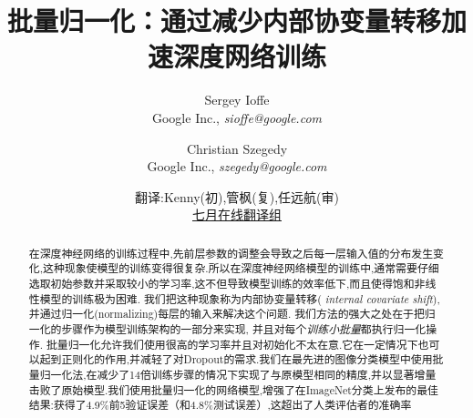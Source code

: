 \documentclass[twocolumn]{article}
\begin{document}
\newcommand{\jac}[2]{\frac{\partial #1}{\partial #2}}
\newcommand{\xhat}{\widehat{x}}
\newcommand{\yhat}{\widehat{y}}
\newcommand{\zhat}{\widehat{z}}
\newcommand{\vxhat}{\widehat\mathrm{x}}
\newcommand{\vzhat}{\widehat\mathrm{z}}
\newcommand{\setX}{\mathcal{X}}
\newcommand{\setB}{\mathcal{B}}
\newcommand{\E}{\text{E}}
\newcommand{\Var}{\text{Var}}
\newcommand{\Cov}{\text{Cov}}
\newcommand{\Fhat}{\widehat{F}}
\newcommand{\Thetahat}{\widehat{\Theta}}
\newcommand{\Norm}{\text{Norm}}
\newcommand{\BatchNorm}{\text{BN}}
\newcommand{\kk}{{(k)}}
\newcommand{\vx}{\mathrm{x}}
\newcommand{\vy}{\mathrm{y}}
\newcommand{\vz}{\mathrm{z}}
\newcommand{\vb}{\mathrm{b}}
\newcommand{\vu}{\mathrm{u}}
\newcommand{\comt}{// }
\renewcommand{\algorithmiccomment}[1]{\comt #1}
\newcommand{\BN}[2]{\text{BN}_{#2}(#1)}
\renewcommand{\algorithmicrequire}{\textbf{Input:}}
\renewcommand{\algorithmicensure}{\textbf{Output:}}
\newcommand{\mils}{\cdot 10^6}
\newcommand{\netw}[1]{{\sl #1}}
\newcommand{\norig}{\text{\sl N}}
\newcommand{\ntrain}{\norig_\mathrm{BN}^\mathrm{tr}}
\newcommand{\ninf}{\norig_\mathrm{BN}^\mathrm{inf}}
\renewcommand{\cite}[1]{\citep{#1}}

\title{批量归一化：通过减少内部协变量转移加速深度网络训练}

\author{Sergey Ioffe \\Google Inc., {\sl sioffe@google.com} \and
Christian Szegedy \\Google Inc., {\sl szegedy@google.com} \and 翻译:Kenny(初),管枫(复),任远航(审)\\
\href{https://github.com/JulyEdu-PaperTranslation/DeepLearning}{七月在线翻译组}
}

\date{}

\maketitle

\begin{abstract}

在深度神经网络的训练过程中,先前层参数的调整会导致之后每一层输入值的分布发生变化,这种现象使模型的训练变得很复杂.所以在深度神经网络模型的训练中,通常需要仔细选取初始参数并采取较小的学习率,这不但导致模型训练的效率低下,而且使得饱和非线性模型的训练极为困难. 我们把这种现象称为内部协变量转移({\em
  internal covariate shift}),并通过归一化(normalizing)每层的输入来解决这个问题.  
我们方法的强大之处在于把归一化的步骤作为模型训练架构的一部分来实现, 并且对每个{\em 训练小批量}都执行归一化操作.
批量归一化允许我们使用很高的学习率并且对初始化不太在意.它在一定情况下也可以起到正则化的作用,并减轻了对Dropout的需求.我们在最先进的图像分类模型中使用批量归一化法,在减少了14倍训练步骤的情况下实现了与原模型相同的精度,并以显著增量击败了原始模型.我们使用批量归一化的网络模型,增强了在ImageNet分类上发布的最佳结果:获得了4.9\%前5验证误差（和4.8\%测试误差）,这超出了人类评估者的准确率
\end{abstract}
\end{document}
